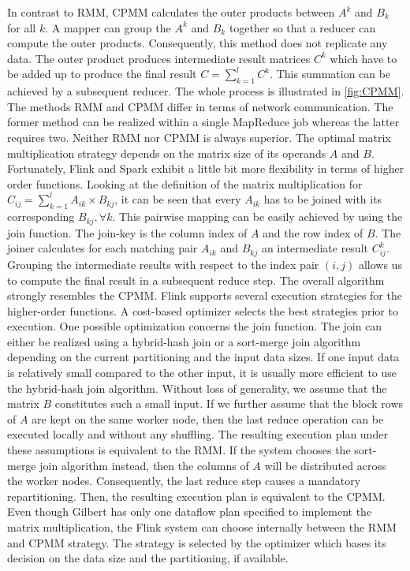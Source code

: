 In contrast to RMM, CPMM calculates the outer products between $A^k$ and $B_k$ for all $k$. A mapper can group the $A^k$ and $B_k$ together so that a reducer can compute the outer products. Consequently, this method does not replicate any data. The outer product produces intermediate result matrices $C^k$ which have to be added up to produce the final result $C=\sum_{k=1}^{l} C^k$. This summation can be achieved by a subsequent reducer. The whole process is illustrated in \cref{fig:CPMM}. The methods RMM and CPMM differ in terms of network communication. The former method can be realized within a single MapReduce job whereas the latter requires two. Neither RMM nor CPMM is always superior. The optimal matrix multiplication strategy depends on the matrix size of its operands $A$ and $B$. Fortunately, Flink and Spark exhibit a little bit more flexibility in terms of higher order functions. Looking at the definition of the matrix multiplication for $C_{ij}=\sum_{k=1}^{l}A_{ik}\times B_{kj}$, it can be seen that every $A_{ik}$ has to be joined with its corresponding $B_{kj},\forall k$. This pairwise mapping can be easily achieved by using the join function. The join-key is the column index of $A$ and the row index of $B$. The joiner calculates for each matching pair $A_{ik}$ and $B_{kj}$ an intermediate result $C_{ij}^k$. Grouping the intermediate results with respect to the index pair $(i,j)$ allows us to compute the final result in a subsequent reduce step. The overall algorithm strongly resembles the CPMM. Flink supports several execution strategies for the higher-order functions. A cost-based optimizer selects the best strategies prior to execution. One possible optimization concerns the join function. The join can either be realized using a hybrid-hash join or a sort-merge join algorithm depending on the current partitioning and the input data sizes. If one input data is relatively small compared to the other input, it is usually more efficient to use the hybrid-hash join algorithm. Without loss of generality, we assume that the matrix $B$ constitutes such a small input. If we further assume that the block rows of $A$ are kept on the same worker node, then the last reduce operation can be executed locally and without any shuffling. The resulting execution plan under these assumptions is equivalent to the RMM. If the system chooses the sort-merge join algorithm instead, then the columns of $A$ will be distributed across the worker nodes. Consequently, the last reduce step causes a mandatory repartitioning. Then, the resulting execution plan is equivalent to the CPMM. Even though Gilbert has only one dataflow plan specified to implement the matrix multiplication, the Flink system can choose internally between the RMM and CPMM strategy. The strategy is selected by the optimizer which bases its decision on the data size and the partitioning, if available. %